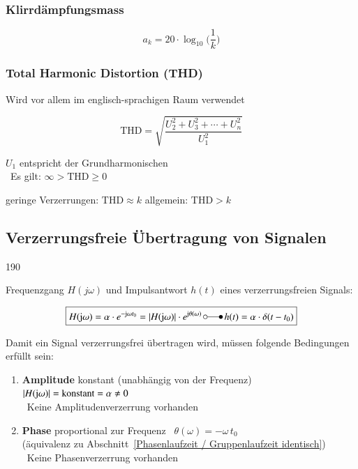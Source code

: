 \subsubsection{Klirrdämpfungsmass}

$$ \boxed{ a_k = 20 \cdot \log_{10} \Big( \frac{1}{k}  \Big)  } $$


\subsubsection{Total Harmonic Distortion (THD)}
Wird vor allem im englisch-sprachigen Raum verwendet

\begin{minipage}[b]{0.48\columnwidth}
   $$ \boxed{  \text{THD} = \sqrt{\frac{U_2^2 + U_3^2 + \cdots + U_n^2}{U_1^2} } } $$
\end{minipage}
\hfill
\begin{minipage}[c]{0.48\columnwidth}
    \raggedright%
    $U_1$ entspricht der Grundharmonischen\\
    \textrightarrow\ Es gilt:  $\infty > \text{THD} \geq 0$ 
\end{minipage}

\vspace{0.2cm}
geringe Verzerrungen: $\text{THD} \approx k$ \qquad allgemein: $\text{THD} > k$


\subsection{Verzerrungsfreie Übertragung von Signalen}{190}

Frequenzgang $H(j \omega)$ und Impulsantwort $h(t)$ eines verzerrungsfreien Signals:

$$ \boxed{ H(\jimg  \omega) = \alpha \cdot e^{- \jimg  \omega t_0} 
    = | H(\jimg  \omega)|  \cdot e^{\jimg  \theta(\omega)}  \, \laplace \,  h(t) = \alpha \cdot \delta(t - t_0) } $$


Damit ein Signal verzerrungsfrei übertragen wird, müssen folgende Bedingungen erfüllt sein:

\begin{enumerate}
    \item \textbf{Amplitude} konstant (unabhängig von der Frequenz) \textlrarrow\ $| H(\mathrm{j}  \omega)| = \text{konstant} = \alpha \neq 0$\\
        \textrightarrow\ Keine Amplitudenverzerrung vorhanden
    \item \textbf{Phase} proportional zur Frequenz \textlrarrow\ $\theta(\omega) = - \omega \, t_0$\\
        (äquivalenz zu Abschnitt\ \ref{Phasenlaufzeit / Gruppenlaufzeit identisch})
        \textrightarrow\ Keine Phasenverzerrung vorhanden
\end{enumerate}


